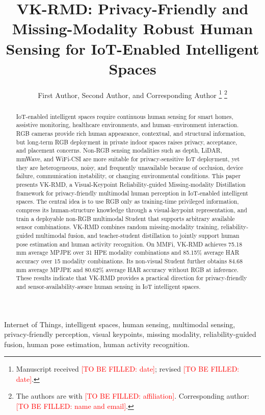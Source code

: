 \documentclass[journal]{IEEEtran}
\newcommand{\todo}[1]{\textcolor{red}{[TO BE FILLED: #1]}}
\begin{document}
\title{VK-RMD: Privacy-Friendly and Missing-Modality Robust Human Sensing for IoT-Enabled Intelligent Spaces}

\author{First Author, Second Author, and Corresponding Author%
\thanks{Manuscript received \todo{date}; revised \todo{date}.}
\thanks{The authors are with \todo{affiliation}. Corresponding author: \todo{name and email}.}}

\maketitle

\begin{abstract}
IoT-enabled intelligent spaces require continuous human sensing for smart homes, assistive monitoring, healthcare environments, and human--environment interaction. RGB cameras provide rich human appearance, contextual, and structural information, but long-term RGB deployment in private indoor spaces raises privacy, acceptance, and placement concerns. Non-RGB sensing modalities such as depth, LiDAR, mmWave, and WiFi-CSI are more suitable for privacy-sensitive IoT deployment, yet they are heterogeneous, noisy, and frequently unavailable because of occlusion, device failure, communication instability, or changing environmental conditions. This paper presents VK-RMD, a Visual-Keypoint Reliability-guided Missing-modality Distillation framework for privacy-friendly multimodal human perception in IoT-enabled intelligent spaces. The central idea is to use RGB only as training-time privileged information, compress its human-structure knowledge through a visual-keypoint representation, and train a deployable non-RGB multimodal Student that supports arbitrary available sensor combinations. VK-RMD combines random missing-modality training, reliability-guided multimodal fusion, and teacher-student distillation to jointly support human pose estimation and human activity recognition. On MMFi, VK-RMD achieves 75.18 mm average MPJPE over 31 HPE modality combinations and 85.15\% average HAR accuracy over 15 modality combinations. Its non-visual Student further obtains 84.68 mm average MPJPE and 80.62\% average HAR accuracy without RGB at inference. These results indicate that VK-RMD provides a practical direction for privacy-friendly and sensor-availability-aware human sensing in IoT intelligent spaces.
\end{abstract}

\begin{IEEEkeywords}
Internet of Things, intelligent spaces, human sensing, multimodal sensing, privacy-friendly perception, visual keypoints, missing modality, reliability-guided fusion, human pose estimation, human activity recognition.
\end{IEEEkeywords}
\end{document}
